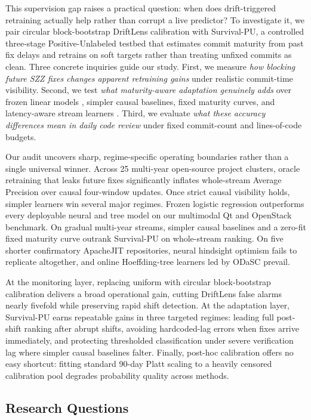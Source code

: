 \documentclass[pdflatex,sn-basic]{sn-jnl}
\theoremstyle{definition}
\theoremstyle{plain}
\begin{document}
This supervision gap raises a practical question: when does drift-triggered retraining actually help rather than corrupt a live predictor? To investigate it, we pair circular block-bootstrap DriftLens calibration with Survival-PU, a controlled three-stage Positive-Unlabeled testbed that estimates commit maturity from past fix delays and retrains on soft targets rather than treating unfixed commits as clean. Three concrete inquiries guide our study. First, we measure \textit{how blocking future SZZ fixes changes apparent retraining gains} under realistic commit-time visibility. Second, we test \textit{what maturity-aware adaptation genuinely adds} over frozen linear models \citep{zeng2021deep}, simpler causal baselines, fixed maturity curves, and latency-aware stream learners \citep{cabral2019class,cabral2023borb,song2022odasc}. Third, we evaluate \textit{what these accuracy differences mean in daily code review} under fixed commit-count and lines-of-code budgets.

Our audit uncovers sharp, regime-specific operating boundaries rather than a single universal winner. Across 25 multi-year open-source project clusters, oracle retraining that leaks future fixes significantly inflates whole-stream Average Precision over causal four-window updates. Once strict causal visibility holds, simpler learners win several major regimes. Frozen logistic regression outperforms every deployable neural and tree model on our multimodal Qt and OpenStack benchmark. On gradual multi-year streams, simpler causal baselines and a zero-fit fixed maturity curve outrank Survival-PU on whole-stream ranking. On five shorter confirmatory ApacheJIT repositories, neural hindsight optimism fails to replicate altogether, and online Hoeffding-tree learners led by ODaSC prevail.

At the monitoring layer, replacing uniform with circular block-bootstrap calibration delivers a broad operational gain, cutting DriftLens false alarms nearly fivefold while preserving rapid shift detection. At the adaptation layer, Survival-PU earns repeatable gains in three targeted regimes: leading full post-shift ranking after abrupt shifts, avoiding hardcoded-lag errors when fixes arrive immediately, and protecting thresholded classification under severe verification lag where simpler causal baselines falter. Finally, post-hoc calibration offers no easy shortcut: fitting standard 90-day Platt scaling to a heavily censored calibration pool degrades probability quality across methods.

\subsection{Research Questions}
\label{sec:rqs}
\end{document}
